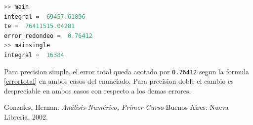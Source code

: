 \documentclass[11pt,a4paper]{article}
\begin{document}
\begin{lstlisting}[language=Octave,title=Corrida entera sin truncamiento]
>> main
integral =  69457.61896
te =  76411515.04281
error_redondeo =  0.76412
>> mainsingle
integral =  16384
\end{lstlisting}

Para precision simple, el error total queda acotado por \texttt{0.76412} segun la formula \ref{errortotal} en ambos casos del enunciado. Para precision doble el cambio es despreciable en ambos casos con respecto a los demas errores.

\newpage

{}
\renewcommand\refname{Bibliografía}
\begin{thebibliography}{9}

Gonzales, Hernan: 
\textit{Análisis Numérico, Primer Curso}
Buenos Aires: Nueva Librería, 2002.

\end{thebibliography}
\end{document}
